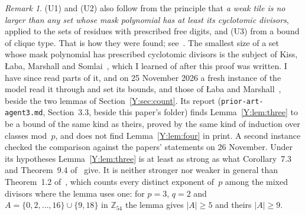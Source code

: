 \documentclass[11pt,a4paper]{amsart}
\theoremstyle{definition}
\theoremstyle{remark}
\newtheorem{remark}[theorem]{Remark}
\newcommand{\Z}{\mathbb{Z}}
\begin{document}
\begin{remark}
(U1) and (U2) also follow from the principle that \emph{a weak tile is no larger than any set whose mask
polynomial has at least its cyclotomic divisors}, applied to the sets of residues with prescribed free digits,
and (U3) from a bound of clique type. That is how they were found; see~\cite{Ynote}.
The smallest size of a set whose mask polynomial has prescribed cyclotomic divisors is the subject of Kiss,
{\L}aba, Marshall and Somlai~\cite{KLaMS}, which I learned of after this proof was written. I have since read
parts of it, and on 25 November 2026 a fresh instance of the model read it through and set its bounds, and those
of {\L}aba and Marshall~\cite{LaM}, beside the two lemmas of Section~\ref{Y:sec:count}. Its report
(\texttt{prior-art-agent3.md}, Section~3.3, beside this paper's folder) finds Lemma~\ref{Y:lem:three} to be a
bound of the same kind as theirs, proved by the same kind of induction over classes mod~$p$, and does
not find Lemma~\ref{Y:lem:four} in print. A second instance checked the comparison against the papers'
statements on 26 November. Under its hypotheses Lemma~\ref{Y:lem:three} is at least as strong as what
Corollary~7.3 and Theorem~9.4 of~\cite{KLaMS} give. It is neither stronger nor weaker in general than
Theorem~1.2 of~\cite{LaM}, which counts every distinct exponent of~$p$ among the mixed divisors where the lemma
uses one: for $p=3$, $q=2$ and $A=\{0,2,\dots,16\}\cup\{9,18\}$ in $\Z_{54}$ the lemma gives $|A|\ge 5$ and
theirs $|A|\ge 9$.


\end{remark}
\end{document}
